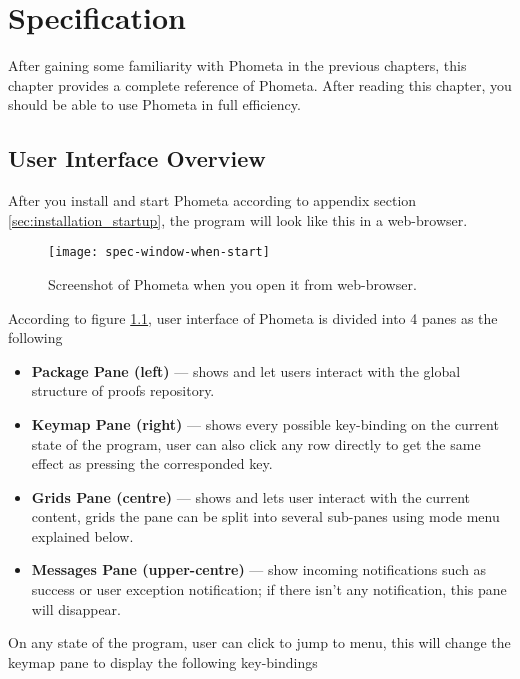 \documentclass[master.tex]{subfiles}
\begin{document}
\chapter{Specification}
\label{chap:specification}

After gaining some familiarity with Phometa in the previous chapters, this
chapter provides a complete reference of Phometa. After reading this chapter,
you should be able to use Phometa in full efficiency.

\section{User Interface Overview}

After you install and start Phometa according to appendix section
\ref{sec:installation_startup}, the program will look like this in a web-browser.

\begin{figure}[H]
    \centering
    \texttt{[image: spec-window-when-start]}
    \caption{Screenshot of Phometa when you open it from web-browser.}
\label{fig:specification-phometa-home-window}
\end{figure}

According to figure \ref{fig:specification-phometa-home-window}, user interface
of Phometa is divided into 4 panes as the following

\begin{itemize}
\item\textbf{Package Pane (left)} --- shows and let users interact with the
  global structure of proofs repository.
\item\textbf{Keymap Pane (right)} --- shows every possible key-binding on the
  current state of the program, user can also click any row directly to get the
  same effect as pressing the corresponded key.
\item\textbf{Grids Pane (centre)} --- shows and lets user interact with the
  current content, grids the pane can be split into several sub-panes using mode
  menu explained below.
\item\textbf{Messages Pane (upper-centre)} --- show incoming notifications such
  as success or user exception notification; if there isn't any notification,
  this pane will disappear.
\end{itemize}

On any state of the program, user can click  to jump to menu,
this will change the keymap pane to display the following key-bindings
\end{document}
